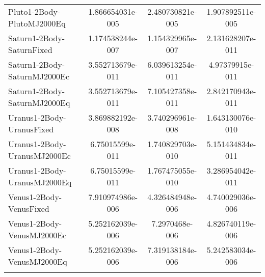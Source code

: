 \begin{table}[htbp!]
\begin{tabular}{lccc}
         Pluto1-2Body-PlutoMJ2000Eq & 1.866654031e-005 & 2.480730821e-005 & 1.907892511e-005 \\
         Saturn1-2Body-SaturnFixed & 1.174538244e-007 & 1.154329965e-007 & 2.131628207e-011 \\
         Saturn1-2Body-SaturnMJ2000Ec & 3.552713679e-011 & 6.039613254e-011 & 4.97379915e-011 \\
         Saturn1-2Body-SaturnMJ2000Eq & 3.552713679e-011 & 7.105427358e-011 & 2.842170943e-011 \\
         Uranus1-2Body-UranusFixed & 3.869882192e-008 & 3.740296961e-008 & 1.643130076e-010 \\
         Uranus1-2Body-UranusMJ2000Ec & 6.75015599e-011 & 1.740829703e-010 & 5.151434834e-011 \\
         Uranus1-2Body-UranusMJ2000Eq & 6.75015599e-011 & 1.767475055e-010 & 3.286954042e-011 \\
         Venus1-2Body-VenusFixed & 7.910974986e-006 & 4.326484948e-006 & 4.740029036e-006 \\
         Venus1-2Body-VenusMJ2000Ec & 5.252162039e-006 & 7.2970468e-006 & 4.826740119e-006 \\
         Venus1-2Body-VenusMJ2000Eq & 5.252162039e-006 & 7.319138184e-006 & 5.242583034e-006 \\
      \hline\hline
      \label{Table: WinGMAT-MacGMAT CS Parameters Set 2} 
\end{tabular}
\end{table}
